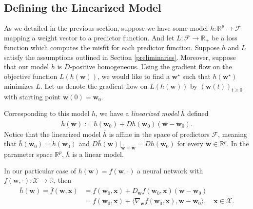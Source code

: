 \documentclass{article}
\begin{document}
\subsection{Defining the Linearized Model}
As we detailed in the previous section, suppose we have some model $h: \mathbb{R}^p \rightarrow \mathcal{F}$ mapping a weight vector to a predictor function. And let $L: \mathcal{F} \rightarrow \mathbb{R}_+$ be a loss function which computes the misfit for each predictor function. Suppose $h$ and $L$ satisfy the assumptions outlined in Section \ref{preliminaries}. Moreover, suppose that our model $h$ is $D$-positive homogeneous. Using the gradient flow on the objective function $L(h(\boldsymbol{w}))$, we would like to find a $\boldsymbol{w}^{\star}$ such that $h(\boldsymbol{w}^{\star})$ minimizes $L$. Let us denote the gradient flow on $L(h(\boldsymbol{w}))$ by $(\boldsymbol{w}(t))_{t \geq 0}$ with starting point $\boldsymbol{w}(0) = \boldsymbol{w}_0$.

Corresponding to this model $h$, we have a \textit{linearized model} $\bar{h}$ defined
\begin{align}
    \bar{h}(\boldsymbol{w}) := h(\boldsymbol{w}_0) + Dh(\boldsymbol{w}_0)(\boldsymbol{w}-\boldsymbol{w}_0).\label{linearizedmodel}
\end{align}
Notice that the linearized model $\bar{h}$ is affine in the space of predictors $\mathcal{F}$, meaning that $\bar{h}(\boldsymbol{w}_0) = h(\boldsymbol{w}_0)$ and $D \bar{h}(\boldsymbol{w})|_{\boldsymbol{w} = \boldsymbol{\tilde{w}}} = D h(\boldsymbol{w}_0)$ for every $\boldsymbol{\tilde{w}} \in \mathbb{R}^p$. In the parameter space $\mathbb{R}^p$, $\bar{h}$ is a linear model.

In our particular case of $h(\boldsymbol{w}) = f(\boldsymbol{w}, \cdot)$ a neural network with $f(\boldsymbol{w}, \cdot): \mathcal{X} \rightarrow \mathbb{R}$, then
\begin{align}
    \bar{h}(\boldsymbol{w}) = \bar{f}(\boldsymbol{w}, \boldsymbol{x}) &= f(\boldsymbol{w}_0, \boldsymbol{x}) + D_{\boldsymbol{w}}f(\boldsymbol{w}_0, \boldsymbol{x})(\boldsymbol{w}-\boldsymbol{w}_0) \nonumber\\ 
    &= f(\boldsymbol{w}_0, \boldsymbol{x}) + \langle \nabla_{\boldsymbol{w}} f(\boldsymbol{w}_0, \boldsymbol{x}), \boldsymbol{w}-\boldsymbol{w}_0\rangle, \quad \boldsymbol{x} \in \mathcal{X}.\label{linearizedmodelnetwork}
\end{align}
\end{document}
